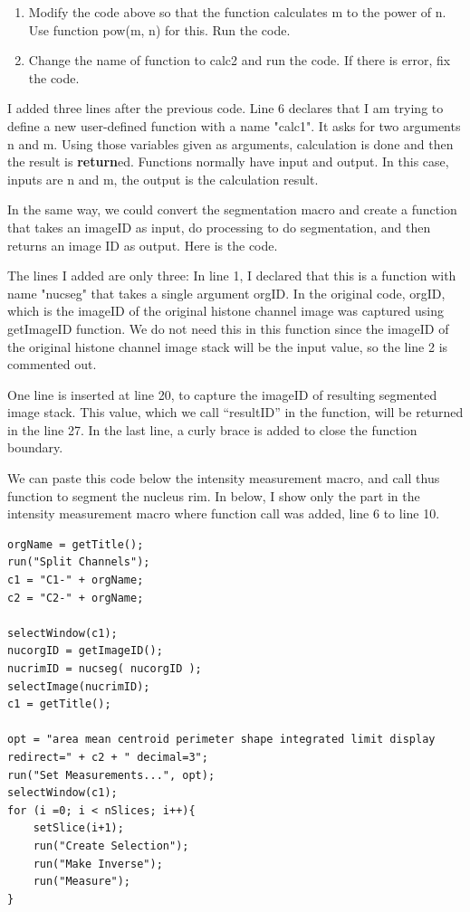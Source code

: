 \begin{indentexercise}{3}
\begin{enumerate}
\item Modify the code above so that the function calculates m to the power of n. Use function pow(m, n) for this. Run the code. 

\item Change the name of function to calc2 and run the code. If there is error, fix the code. 
\end{enumerate}

\end{indentexercise}

I added three lines after the previous code. Line 6 declares that I am trying to define a new user-defined function with a name "calc1". It asks for two arguments n and m. Using those variables given as arguments, calculation is done and then the result is \textbf{return}ed. Functions normally have input and output. In this case, inputs are n and m, the output is the calculation result. 

In the same way, we could convert the segmentation macro and create a function that takes an imageID as input, do processing to do segmentation, and then returns an image ID as output. Here is the code. 



The lines I added are only three: In line 1, I declared that this is a function with name "nucseg" that takes a single argument orgID. In the original code, orgID, which is the imageID of the original histone channel image was captured using getImageID function. We do not need this in this function since the imageID of the original histone channel image stack will be the input value, so the line 2 is commented out. 

One line is inserted at line 20, to capture the imageID of resulting segmented image stack. This value, which we call ``resultID'' in the function, will be returned in the line 27. In the last line, a curly brace is added to close the function boundary. 

We can paste this code below the intensity measurement macro, and call thus function to segment the nucleus rim. In below, I show only the part in the intensity measurement macro where function call was added, line 6 to line 10. 

\begin{lstlisting}
orgName = getTitle();
run("Split Channels");
c1 = "C1-" + orgName;
c2 = "C2-" + orgName;

selectWindow(c1);
nucorgID = getImageID();
nucrimID = nucseg( nucorgID );
selectImage(nucrimID);
c1 = getTitle();

opt = "area mean centroid perimeter shape integrated limit display redirect=" + c2 + " decimal=3";
run("Set Measurements...", opt);
selectWindow(c1);
for (i =0; i < nSlices; i++){
	setSlice(i+1);
	run("Create Selection");
	run("Make Inverse");
	run("Measure");
}
\end{lstlisting}

